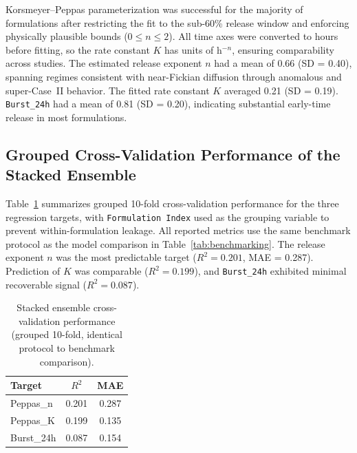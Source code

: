 Korsmeyer--Peppas parameterization was successful for the majority of formulations after restricting the fit to the sub-60\% release window and enforcing physically plausible bounds ($0 \le n \le 2$). All time axes were converted to hours before fitting, so the rate constant $K$ has units of h$^{-n}$, ensuring comparability across studies. The estimated release exponent $n$ had a mean of 0.66 (SD = 0.40), spanning regimes consistent with near-Fickian diffusion through anomalous and super-Case~II behavior. The fitted rate constant $K$ averaged 0.21 (SD = 0.19). \texttt{Burst\_24h} had a mean of 0.81 (SD = 0.20), indicating substantial early-time release in most formulations.

\FloatBarrier

\subsection{Grouped Cross-Validation Performance of the Stacked Ensemble}

Table~\ref{tab:cv_performance} summarizes grouped 10-fold cross-validation performance for the three regression targets, with \texttt{Formulation Index} used as the grouping variable to prevent within-formulation leakage. All reported metrics use the same benchmark protocol as the model comparison in Table~\ref{tab:benchmarking}. The release exponent $n$ was the most predictable target ($R^2 = 0.201$, MAE = 0.287). Prediction of $K$ was comparable ($R^2 = 0.199$), and \texttt{Burst\_24h} exhibited minimal recoverable signal ($R^2 = 0.087$).


\begin{table}[H]
\centering
\caption{Stacked ensemble cross-validation performance (grouped 10-fold, identical protocol to benchmark comparison).}
\label{tab:cv_performance}
\begin{tabular}{lcc}
\toprule
Target & $R^2$ & MAE \\
\midrule
Peppas\_n & 0.201 & 0.287 \\
Peppas\_K & 0.199 & 0.135 \\
Burst\_24h & 0.087 & 0.154 \\
\bottomrule
\end{tabular}
\end{table}

